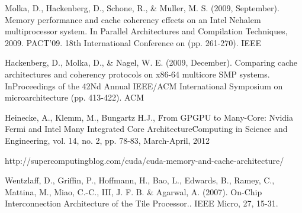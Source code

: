 \begin{thebibliography}{99}
 Molka, D., Hackenberg, D., Schone, R., \& Muller, M. S. (2009, September). Memory performance and cache coherency effects on an Intel Nehalem multiprocessor system. In Parallel Architectures and Compilation Techniques, 2009. PACT'09. 18th International Conference on (pp. 261-270). IEEE

 Hackenberg, D., Molka, D., \& Nagel, W. E. (2009, December). Comparing cache architectures and coherency protocols on x86-64 multicore SMP systems. InProceedings of the 42Nd Annual IEEE/ACM International Symposium on microarchitecture (pp. 413-422). ACM

 Heinecke, A., Klemm, M., Bungartz H.J., \"From GPGPU to Many-Core: Nvidia Fermi and Intel Many Integrated Core Architecture\" Computing in Science and Engineering, vol. 14, no. 2, pp. 78-83, March-April, 2012 

 http://supercomputingblog.com/cuda/cuda-memory-and-cache-architecture/

 Wentzlaff, D., Griffin, P., Hoffmann, H., Bao, L., Edwards, B., Ramey, C., Mattina, M., Miao, C.-C., III, J. F. B. \& Agarwal, A. (2007). On-Chip Interconnection Architecture of the Tile Processor.. IEEE Micro, 27, 15-31. 

\end{thebibliography}
